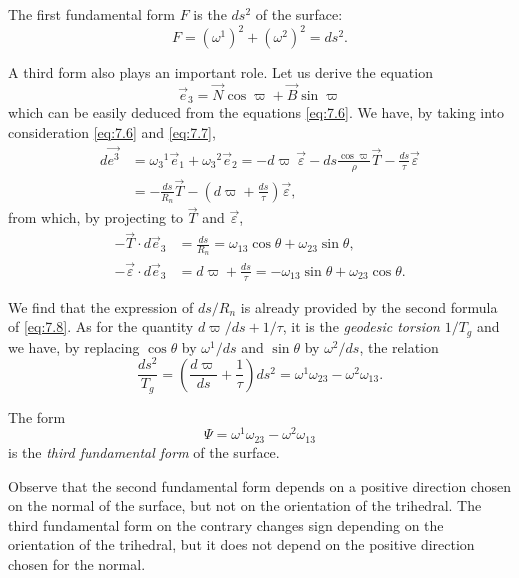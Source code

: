 \documentclass[leqno,11pt]{book}
\numberwithin{equation}{chapter}
\theoremstyle{shape1}
\theoremstyle{shape0}
\theoremstyle{shape2}
\theoremstyle{definition}
\begin{document}
The first fundamental form $F$ is the $ds^{2}$ of the surface:
\begin{equation}
  \label{eq:7.10}
  F=(\omega^{1})^{2}+(\omega^{2})^{2}=ds^{2}.
\end{equation}

A third form also plays an important role. Let us derive the equation
\[
\vec e_{3}=\vec N\cos\varpi+\vec B\sin\varpi
\]
which can be easily deduced from the equations \eqref{eq:7.6}. We have, by taking into consideration \eqref{eq:7.6} and \eqref{eq:7.7},
\begin{align*}
  d\vec {e^{3}}&=\omega_{3}{}^{1}\vec e_{1}+\omega_{3}{}^{2}\vec e_{2}=-d\varpi\,\vec \varepsilon-ds\frac{\cos\varpi}{\rho}\vec T-\frac{ds}{\tau}\vec\varepsilon\\
  &=-\frac{ds}{R_{n}}\vec T-\left(d\varpi+\frac{ds}{\tau}\right)\vec \varepsilon,
\end{align*}
from which, by projecting to $\vec T$ and $\vec \varepsilon$,
\begin{align*}
  -\vec T\cdot d\vec e_{3}&=\frac{ds}{R_{n}}=\omega_{13}\cos\theta+\omega_{23}\sin\theta,\\
  -\vec\varepsilon\cdot d\vec e_{3}&=d\varpi+\frac{ds}{\tau}=-\omega_{13}\sin\theta+\omega_{23}\cos\theta.
\end{align*}

We find that the expression of $ds/R_{n}$ is already provided by the second formula of \eqref{eq:7.8}. As for the quantity $d\varpi/ds+1/\tau$, it is the \emph{geodesic torsion} $1/T_{g}$ and we have, by replacing $\cos\theta$ by $\omega^{1}/ds$ and $\sin\theta$ by $\omega^{2}/ds$, the relation
\begin{equation}
  \label{eq:7.11}
  \frac{ds^{2}}{T_{g}}=\left(\frac{d\varpi}{ds}+\frac{1}{\tau}\right)ds^{2}=\omega^{1}\omega_{23}-\omega^{2}\omega_{13}.
\end{equation}

The form
\begin{equation}
  \label{eq:24}
  \Psi=\omega^{1}\omega_{23}-\omega^{2}\omega_{13}
\end{equation}
is the \emph{third fundamental form} of the surface.

Observe that the second fundamental form depends on a positive direction chosen on the normal of the surface, but not on the orientation of the trihedral. The third fundamental form on the contrary changes sign depending on the orientation of the trihedral, but it does not depend on the positive direction chosen for the normal.
\end{document}
